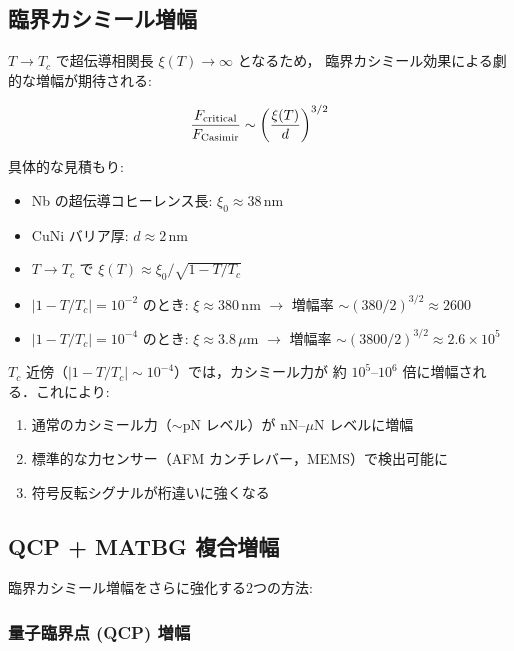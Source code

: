 \subsection{臨界カシミール増幅}

$T \to T_c$ で超伝導相関長 $\xi(T) \to \infty$ となるため，
臨界カシミール効果による劇的な増幅が期待される:

\begin{equation}
\frac{F_{\rm critical}}{F_{\rm Casimir}} \sim \left(\frac{\xi(T)}{d}\right)^{3/2}
\end{equation}

具体的な見積もり:
\begin{itemize}
\item Nb の超伝導コヒーレンス長: $\xi_0 \approx 38$\,nm
\item CuNi バリア厚: $d \approx 2$\,nm
\item $T \to T_c$ で $\xi(T) \approx \xi_0 / \sqrt{1 - T/T_c}$
\item $|1 - T/T_c| = 10^{-2}$ のとき: $\xi \approx 380$\,nm
  $\to$ 増幅率 $\sim (380/2)^{3/2} \approx 2600$
\item $|1 - T/T_c| = 10^{-4}$ のとき: $\xi \approx 3.8\,\mu$m
  $\to$ 増幅率 $\sim (3800/2)^{3/2} \approx 2.6 \times 10^5$
\end{itemize}

\begin{keyresult}[臨界増幅の帰結]
$T_c$ 近傍（$|1-T/T_c| \sim 10^{-4}$）では，カシミール力が
約 $10^5$--$10^6$ 倍に増幅される．これにより:
\begin{enumerate}
\item 通常のカシミール力（$\sim$pN レベル）が nN--$\mu$N レベルに増幅
\item 標準的な力センサー（AFM カンチレバー，MEMS）で検出可能に
\item 符号反転シグナルが桁違いに強くなる
\end{enumerate}
\end{keyresult}

\subsection{QCP + MATBG 複合増幅}

臨界カシミール増幅をさらに強化する2つの方法:

\subsubsection{量子臨界点 (QCP) 増幅}

